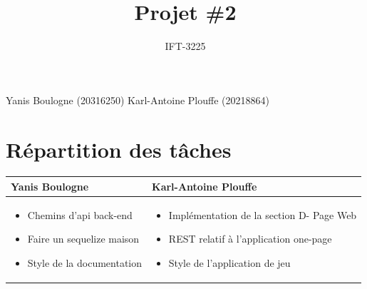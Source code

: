 \documentclass{article}
\title{Projet \#2}
\author{IFT-3225}
\begin{document}
\maketitle

\newcommand \mML {\ensuremath\mu\textsl{ML}}
\newcommand \kw [1] {\textsf{#1}}
\newcommand \id [1] {\textsl{#1}}
\newcommand \punc [1] {\kw{`#1'}}
\newcommand \str [1] {\texttt{"#1"}}
\newenvironment{outitemize}{
  \begin{itemize}
  \let \origitem \item \def \item {\origitem[]\hspace{-18pt}}
}{
  \end{itemize}
}
\newcommand \Align [2][t] {\begin{array}[#1]{@{}l} #2 \end{array}}

\noindent Yanis Boulogne (20316250)\newline
Karl-Antoine Plouffe (20218864) \newline

\section{Répartition des tâches}
\begin{table}[htbp]
\centering
    \setlength{\leftmargini}{0.5cm}
    \begin{tabular}{| p{5cm} | p{5cm} |}
        \hline
        Yanis Boulogne & Karl-Antoine Plouffe \\
        \hline
        \begin{itemize} 
            \item Chemins d'api back-end
            \item Faire un sequelize maison
            \item Style de la documentation
        \end{itemize} & 
        \begin{itemize} 
            \item Implémentation de la section D- Page Web 
            \item REST relatif à l'application one-page
            \item Style de l'application de jeu
        \end{itemize} \\
        \hline
    \end{tabular}
\end{table}
\end{document}
